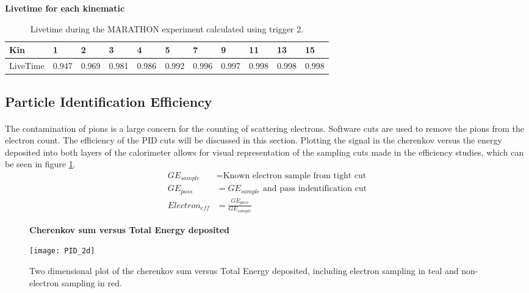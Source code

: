 \begin{table}[]
	\textbf{Livetime for each kinematic }\par\medskip
	\begin{tabular}{|l|l|l|l|l|l|l|l|l|l|l|}
		\hline
		Kin      & 1 & 2 & 3 & 4 & 5 & 7 & 9 & 11 & 13 & 15 \\ \hline
		LiveTime & 0.947 & 0.969 & 0.981 & 0.986 & 0.992 & 0.996 & 0.997 & 0.998  & 0.998  & 0.998\\ \hline
	\end{tabular}
	\caption{Livetime during the MARATHON experiment calculated using trigger 2.  }
	\label{LTtable}
\end{table}
  

\subsection{Particle Identification Efficiency}\label{ss:PID}
\paragraph{} The contamination of pions is a large concern for the counting of scattering electrons. Software cuts are used to remove the pions from the electron count. The efficiency of the PID cuts will be discussed in this section. Plotting the signal in the cherenkov versus the energy deposited into both layers of the calorimeter allows for visual representation of the sampling cuts made in the efficiency studies, which can be seen in figure \ref{elesample}. 
\begin{equation}\label{effequ}
\begin{split}
GE_{sample} & = \textrm{Known electron sample from tight cut}  \\
GE_{pass} & = \textrm{$GE_{sample}$ and pass indentification cut} \\
Electron_{eff}  & = \frac{ GE_{pass} } { GE_{sample} } 
\end{split}
\end{equation}
\begin{figure}[]
	\centering
	\textbf{Cherenkov sum versus Total Energy deposited }\par\medskip
	\texttt{[image: PID\_2d]}
	\caption{Two dimensional plot of the cherenkov sum versus Total Energy deposited, including electron sampling in teal and non-electron sampling in red. }
	\label{elesample}
\end{figure}

